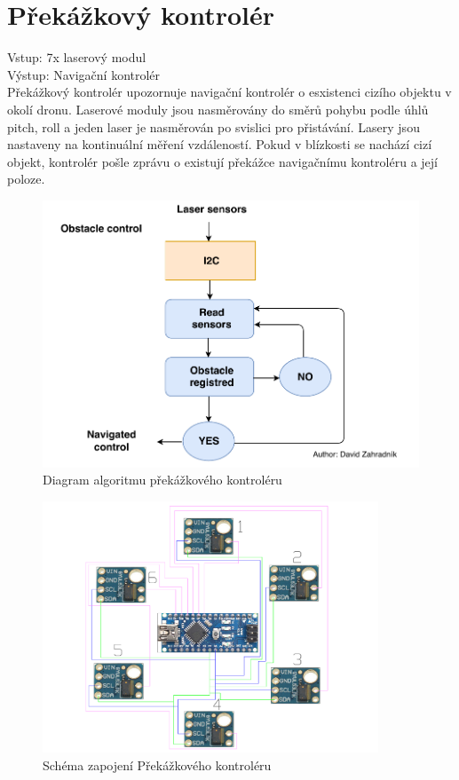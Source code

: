 \section{Překážkový kontrolér} 
Vstup: 7x laserový modul\\
Výstup: Navigační kontrolér\\

Překážkový kontrolér upozornuje navigační kontrolér o esxistenci cizího objektu v okolí dronu. Laserové moduly jsou nasměrovány do směrů pohybu podle úhlů pitch, roll a jeden laser je nasměrován po svislici pro přistávání. Lasery jsou nastaveny na kontinuální měření vzdáleností. Pokud v blízkosti se nachází cizí objekt, kontrolér pošle zprávu o existují překážce navigačnímu kontroléru a její poloze.\\

\begin{figure}[H]
	\centering
	\includegraphics[width=12cm]{pictures/ObstacleDiagram.pdf}
	\caption{Diagram algoritmu překážkového kontroléru}
\end{figure}

\begin{figure}[H]
	\centering
	\includegraphics[width=10cm]{pictures/obstacle.pdf}
	\caption{Schéma zapojení Překážkového kontroléru}
\end{figure}

